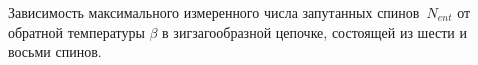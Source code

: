 Зависимость максимального измеренного числа запутанных спинов~$N_{ent}$ от обратной температуры $\beta$
в зигзагообразной цепочке,
состоящей из шести и восьми спинов.
